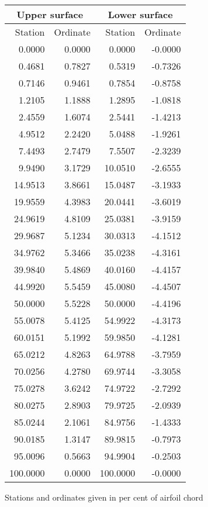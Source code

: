 \documentclass[11pt]{book}
\begin{document}
 \hspace{4mm}
 \begin{tabular}{|r|r|r|r|} \hline 
 \multicolumn{2}{|c|}{Upper surface} & \multicolumn{2}{|c|}{Lower surface} \\
 \hline
 Station & Ordinate & Station & Ordinate \\
 \hline
0.0000 & 0.0000 & 0.0000 & -0.0000 \\
0.4681 & 0.7827 & 0.5319 & -0.7326 \\
0.7146 & 0.9461 & 0.7854 & -0.8758 \\
1.2105 & 1.1888 & 1.2895 & -1.0818 \\
2.4559 & 1.6074 & 2.5441 & -1.4213 \\
4.9512 & 2.2420 & 5.0488 & -1.9261 \\
7.4493 & 2.7479 & 7.5507 & -2.3239 \\
9.9490 & 3.1729 & 10.0510 & -2.6555 \\
14.9513 & 3.8661 & 15.0487 & -3.1933 \\
19.9559 & 4.3983 & 20.0441 & -3.6019 \\
24.9619 & 4.8109 & 25.0381 & -3.9159 \\
29.9687 & 5.1234 & 30.0313 & -4.1512 \\
34.9762 & 5.3466 & 35.0238 & -4.3161 \\
39.9840 & 5.4869 & 40.0160 & -4.4157 \\
44.9920 & 5.5459 & 45.0080 & -4.4507 \\
50.0000 & 5.5228 & 50.0000 & -4.4196 \\
55.0078 & 5.4125 & 54.9922 & -4.3173 \\
60.0151 & 5.1992 & 59.9850 & -4.1281 \\
65.0212 & 4.8263 & 64.9788 & -3.7959 \\
70.0256 & 4.2780 & 69.9744 & -3.3058 \\
75.0278 & 3.6242 & 74.9722 & -2.7292 \\
80.0275 & 2.8903 & 79.9725 & -2.0939 \\
85.0244 & 2.1061 & 84.9756 & -1.4333 \\
90.0185 & 1.3147 & 89.9815 & -0.7973 \\
95.0096 & 0.5663 & 94.9904 & -0.2503 \\
100.0000 & 0.0000 & 100.0000 & -0.0000 \\
 \hline 
 \end{tabular}
 \vspace{8mm}

Stations and ordinates given in per cent of airfoil chord
\end{document}
